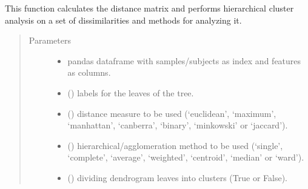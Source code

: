 \documentclass[letterpaper,10pt,english]{sphinxmanual}
\begin{document}

\begin{fulllineitems}
\label{\detokenize{_autosummary/analytics_core.analytics:analytics_core.analytics.wgcnaAnalysis.get_dendrogram}}
This function calculates the distance matrix and performs hierarchical cluster analysis on a set of dissimilarities and methods for analyzing it.
\begin{quote}\begin{description}
\item[{Parameters}] \leavevmode\begin{itemize}
\item {} 
 \textendash{} pandas dataframe with samples/subjects as index and features as columns.

\item {} 
 () \textendash{} labels for the leaves of the tree.

\item {} 
 () \textendash{} distance measure to be used (‘euclidean’, ‘maximum’, ‘manhattan’, ‘canberra’, ‘binary’, ‘minkowski’ or ‘jaccard’).

\item {} 
 () \textendash{} hierarchical/agglomeration method to be used (‘single’, ‘complete’, ‘average’, ‘weighted’, ‘centroid’, ‘median’ or ‘ward’).

\item {} 
 () \textendash{} dividing dendrogram leaves into clusters (True or False).


\end{itemize}
\end{description}
\end{quote}
\end{fulllineitems}
\end{document}
